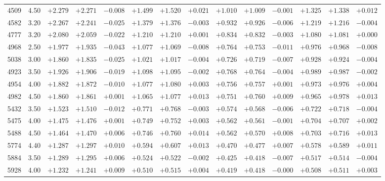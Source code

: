\documentclass[]{aa}
\begin{document}
\begin{appendix}
\begin{table*}
\begin{center}
\begin{tabular}{llllllllllllll}
4509  &4.50 & $+2.279$ & $+2.271$ & $-0.008$ & $+1.499$ & $+1.520$ & $+0.021$ & $+1.010$ & $+1.009$ & $-0.001$ & $+1.325$ & $+1.338$ & $+0.012$ \\
4582  &3.20 & $+2.267$ & $+2.241$ & $-0.025$ & $+1.379$ & $+1.376$ & $-0.003$ & $+0.932$ & $+0.926$ & $-0.006$ & $+1.219$ & $+1.216$ & $-0.004$ \\
4777  &3.20 & $+2.080$ & $+2.059$ & $-0.022$ & $+1.210$ & $+1.210$ & $+0.001$ & $+0.834$ & $+0.832$ & $-0.003$ & $+1.080$ & $+1.081$ & $+0.000$ \\
4968  &2.50 & $+1.977$ & $+1.935$ & $-0.043$ & $+1.077$ & $+1.069$ & $-0.008$ & $+0.764$ & $+0.753$ & $-0.011$ & $+0.976$ & $+0.968$ & $-0.008$ \\
5038  &3.00 & $+1.860$ & $+1.835$ & $-0.025$ & $+1.021$ & $+1.017$ & $-0.004$ & $+0.726$ & $+0.719$ & $-0.007$ & $+0.928$ & $+0.924$ & $-0.004$ \\
4923  &3.50 & $+1.926$ & $+1.906$ & $-0.019$ & $+1.098$ & $+1.095$ & $-0.002$ & $+0.768$ & $+0.764$ & $-0.004$ & $+0.989$ & $+0.987$ & $-0.002$ \\
4954  &4.00 & $+1.882$ & $+1.872$ & $-0.010$ & $+1.077$ & $+1.080$ & $+0.003$ & $+0.756$ & $+0.757$ & $+0.001$ & $+0.973$ & $+0.976$ & $+0.004$ \\
4982  &4.50 & $+1.860$ & $+1.861$ & $+0.001$ & $+1.065$ & $+1.077$ & $+0.013$ & $+0.751$ & $+0.760$ & $+0.009$ & $+0.965$ & $+0.978$ & $+0.013$ \\
5432  &3.50 & $+1.523$ & $+1.510$ & $-0.012$ & $+0.771$ & $+0.768$ & $-0.003$ & $+0.574$ & $+0.568$ & $-0.006$ & $+0.722$ & $+0.718$ & $-0.004$ \\
5475  &4.00 & $+1.475$ & $+1.476$ & $+0.001$ & $+0.749$ & $+0.752$ & $+0.003$ & $+0.562$ & $+0.561$ & $-0.001$ & $+0.704$ & $+0.707$ & $+0.002$ \\
5488  &4.50 & $+1.464$ & $+1.470$ & $+0.006$ & $+0.746$ & $+0.760$ & $+0.014$ & $+0.562$ & $+0.570$ & $+0.008$ & $+0.703$ & $+0.716$ & $+0.013$ \\
5774  &4.40 & $+1.287$ & $+1.297$ & $+0.010$ & $+0.594$ & $+0.607$ & $+0.013$ & $+0.470$ & $+0.477$ & $+0.007$ & $+0.578$ & $+0.589$ & $+0.011$ \\
5884  &3.50 & $+1.289$ & $+1.295$ & $+0.006$ & $+0.524$ & $+0.522$ & $-0.002$ & $+0.425$ & $+0.418$ & $-0.007$ & $+0.517$ & $+0.514$ & $-0.004$ \\
5928  &4.00 & $+1.232$ & $+1.241$ & $+0.009$ & $+0.510$ & $+0.515$ & $+0.004$ & $+0.419$ & $+0.418$ & $-0.000$ & $+0.508$ & $+0.511$ & $+0.003$ \\

\end{tabular}
\end{center}
\end{table*}
\end{appendix}
\end{document}
